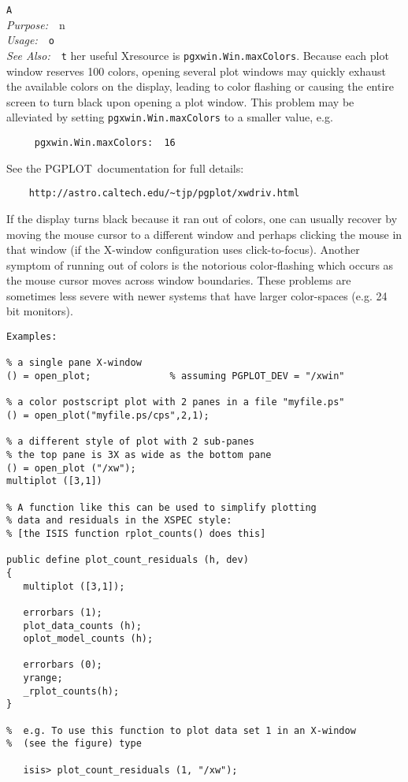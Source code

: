 \documentclass{book}
\makeatletter
\newif\ifpdf
\newcommand{\pgplot}{{\sc PGPLOT}}
\newenvironment{isisfunction}[4]%
{\index{{#1}@{\tt #1}}%
  \ifpdf
  \else
     \addcontentsline{toc}{subsection}{{#1} -- {#2}}
  \fi
  \vbox{
          \vspace*{\baselineskip}
          {\LARGE\tt #1}\vspace*{\baselineskip}\\
          {{\it Purpose:}~~{#2}}\\
          {{\it Usage:}~~{\tt #3}}\\
          {{\it See Also:}~~{\tt #4}}
       }
}%
{ }
\makeatother
\begin{document}
\begin{isisfunction}
Another useful Xresource is {\tt pgxwin.Win.maxColors}. Because each plot
window reserves 100 colors, opening several plot windows may quickly exhaust
the available colors on the display, leading to color flashing or causing
the entire screen to turn black upon opening a plot window. This problem may
be alleviated by setting {\tt pgxwin.Win.maxColors} to a smaller value, e.g.
\begin{verbatim}
     pgxwin.Win.maxColors:  16
\end{verbatim}
See the \pgplot\ documentation for full details:
\begin{verbatim}
    http://astro.caltech.edu/~tjp/pgplot/xwdriv.html
\end{verbatim}
If the display turns black because it ran out of colors, one can usually
recover by moving the mouse cursor to a different window and perhaps
clicking the mouse in that window (if the X-window configuration uses
click-to-focus).  Another symptom of running out of colors is the notorious
color-flashing which occurs as the mouse cursor moves across window
boundaries.  These problems are sometimes less severe with newer systems
that have larger color-spaces (e.g. 24 bit monitors).

\begin{verbatim}
Examples:

% a single pane X-window
() = open_plot;              % assuming PGPLOT_DEV = "/xwin"

% a color postscript plot with 2 panes in a file "myfile.ps"
() = open_plot("myfile.ps/cps",2,1);

% a different style of plot with 2 sub-panes
% the top pane is 3X as wide as the bottom pane
() = open_plot ("/xw");
multiplot ([3,1])

% A function like this can be used to simplify plotting
% data and residuals in the XSPEC style:
% [the ISIS function rplot_counts() does this]

public define plot_count_residuals (h, dev)
{
   multiplot ([3,1]);

   errorbars (1);
   plot_data_counts (h);
   oplot_model_counts (h);

   errorbars (0);
   yrange;
   _rplot_counts(h);
}

%  e.g. To use this function to plot data set 1 in an X-window
%  (see the figure) type

   isis> plot_count_residuals (1, "/xw");

\end{verbatim}
\end{isisfunction}
\end{document}
